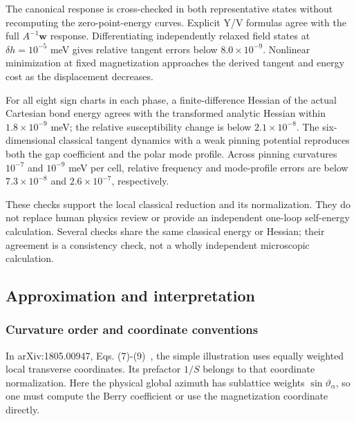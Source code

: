 The canonical response is cross-checked in both representative states
without recomputing the zero-point-energy curves. Explicit Y/V formulas
agree with the full \(A^{-1}\mathbf w\) response. Differentiating
independently relaxed field states at \(\delta h=10^{-5}\) meV gives
relative tangent errors below \(8.0\times10^{-9}\). Nonlinear
minimization at fixed magnetization approaches the derived tangent and
energy cost as the displacement decreases.

For all eight sign charts in each phase, a finite-difference Hessian of
the actual Cartesian bond energy agrees with the transformed analytic
Hessian within \(1.8\times10^{-9}\) meV; the relative susceptibility
change is below \(2.1\times10^{-8}\). The six-dimensional classical
tangent dynamics with a weak pinning potential reproduces both the gap
coefficient and the polar mode profile. Across pinning curvatures
\(10^{-7}\) and \(10^{-9}\) meV per cell, relative frequency and
mode-profile errors are below \(7.3\times10^{-8}\) and
\(2.6\times10^{-7}\), respectively.

These checks support the local classical reduction and its
normalization. They do not replace human physics review or provide an
independent one-loop self-energy calculation. Several checks share the
same classical energy or Hessian; their agreement is a consistency
check, not a wholly independent microscopic calculation.

\subsection{Approximation and interpretation}\label{sec-interpretation}

\subsubsection{Curvature order and coordinate
conventions}\label{curvature-order-and-coordinate-conventions}

In arXiv:1805.00947, Eqs.
(7)-(9)~\cite{rau2018}, the simple illustration uses equally weighted local transverse
coordinates. Its prefactor \(1/S\) belongs to that coordinate
normalization. Here the physical global azimuth has sublattice weights
\(\sin\vartheta_\alpha\), so one must compute the Berry coefficient or
use the magnetization coordinate directly.

